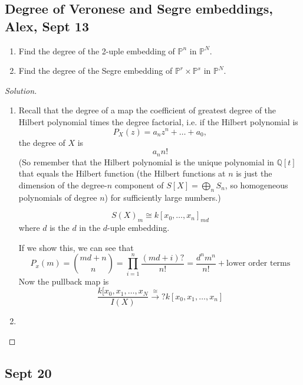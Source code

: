 \subsection{Degree of Veronese and Segre embeddings, Alex, Sept 13}

\begin{manualexercise}{7.1}\leavevmode 
	\begin{enumerate}[label=\alph*.]
		\item Find the degree of the 2-uple embedding of $\mathbb{P}^n$ in $\mathbb{P}^N$.

		\item Find the degree of the Segre embedding of $\mathbb{P}^r\times \mathbb{P}^s$ in $\mathbb{P}^N$.
	\end{enumerate}
\end{manualexercise}

\begin{proof}[Solution]\leavevmode
\begin{enumerate}[label=\alph*.]
	\item Recall that the degree of a map the coefficient of greatest degree of the Hilbert polynomial times the degree factorial, i.e. if the Hilbert polynomial is
	\[P_{X}(z)=a_nz^n+\ldots+a_0,\]
	the degree of $X$ is
	\[a_nn!\]
	(So remember that the Hilbert polynomial is the unique polynomial in $\mathbb{Q}[t]$ that equals the Hilbert function (the Hilbert functions at $n$ is just the dimension of the degree-$n$ component of $S[X]=\bigoplus_{n} S_n $, so homogeneous polynomials of degree $n$) for sufficiently large numbers.)

	\begin{claim}
		\[S(X)_m \cong k[x_0,\ldots,x_n]_{md}\]
		where $d$ is the $d$ in the $d$-uple embedding.
	\end{claim}
	If we show this, we can see that
	\[P_{x}(m)=\binom{md+n}{n}=\prod_{i=1}^n\frac{(md+i)?}{n!}=\frac{d^nm^n}{n!}+\text{lower order terms}  \]
	Now the pullback map is
	\[\frac{k[x_0,x_1,\ldots,x_N}{I(X)}\overset{\cong }{\longrightarrow}?k[x_0,x_1,\ldots,x_n]\]

	\item 
	
	\end{enumerate}

\end{proof}

\subsection{Sept 20}
